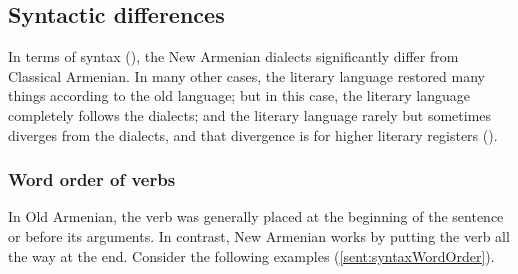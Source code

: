 \begin{adjarianpage}\label{page:23}\end{adjarianpage}%

\subsection{Syntactic differences}

In terms of syntax (), the New Armenian dialects significantly differ from Classical Armenian. In many other cases, the literary language restored many things according to the old language; but in this case, the literary language completely follows the dialects; and the literary language rarely but sometimes diverges from the dialects, and that divergence is for  higher literary registers ().%

\subsubsection{Word order of verbs}

In Old Armenian, the verb was generally placed at the beginning of the sentence or before its arguments. In contrast, New Armenian works by putting the verb all the way at the end. Consider the following examples (\ref{sent:syntaxWordOrder}).

